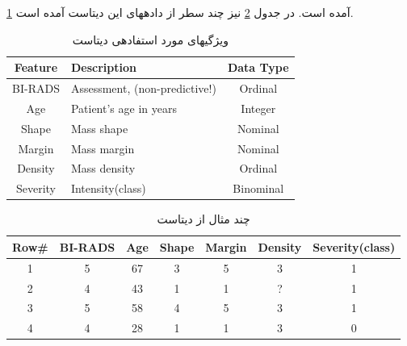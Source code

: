\documentclass[journal]{IEEEtran}
\newcommand{\نیمفاصله}{\halfspace}
\renewcommand{\ }{\halfspace}
\renewcommand{\یا}{یادگیری\ ارجحیت }
\newcommand{\یم}{یادگیری\ ماشین }
\renewcommand{\تر}{تابع رتبه\ بند }
\newcommand{\ار}{ارجحیت }
\renewcommand{\|}[1][.3em]{\hspace{#1}|\hspace{#1}}
\renewcommand{\,}[1][.3em]{,\hspace{#1}}
\begin{document}
\ref{TAB:DATASETS_MAMO_DESC}
آمده است. در جدول
\ref{TAB:DATASETS_MAMO_DATA}
نیز چند سطر از داده\ های این دیتاست آمده است.
\begin{table}[hb]
    \begin{latin}
    \begin{adjustwidth}{-.in}{0in}
    \centering
    \begin{tabular}{clc}
        \hline
        Feature   & Description & Data Type\\\hline
        BI-RADS   & Assessment, (non-predictive!)   & Ordinal\\
        Age       & Patient's age in years          & Integer\\
        Shape     & Mass shape                      & Nominal\\
        Margin    & Mass margin                     & Nominal\\
        Density   & Mass density                    & Ordinal\\
        Severity  & Intensity(class)                & Binominal\\\hline
    \end{tabular}
    \end{adjustwidth}
    \end{latin}
    \caption{ویژگی\ های مورد استفاده\ ی دیتاست }\label{TAB:DATASETS_MAMO_DESC}
\end{table}
\begin{table}[hb]
    \begin{latin}
    \begin{adjustwidth}{-.in}{0in}
    \centering
    \begin{tabular}{ccccccc}
        \hline
        Row\# & BI-RADS & Age & Shape & Margin & Density & Severity(class)\\\hline
        1 & 5 & 67 & 3 & 5 & 3 & 1\\
		2 & 4 & 43 & 1 & 1 & ? & 1\\
		3 & 5 & 58 & 4 & 5 & 3 & 1\\
		4 & 4 & 28 & 1 & 1 & 3 & 0\\
    \end{tabular}
    \end{adjustwidth}
    \end{latin}
    \caption{چند مثال از دیتاست }\label{TAB:DATASETS_MAMO_DATA}
\end{table}
\end{document}
